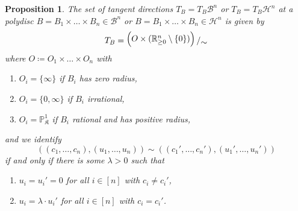 \documentclass[10pt]{article}
\newtheorem{proposition}[theorem]{Proposition}
\theoremstyle{definition}
\newcommand{\PP}{\mathbb{P}}
\newcommand{\bigslant}[2]{{\raisebox{.2em}{$#1$}\left/\raisebox{-.2em}{$#2$}\right.}}
\begin{document}
\begin{proposition}
  \label{prop:tangentSpacePolydisk}
  The set of tangent directions $T_B=T_B\mathcal B^n$ or $T_B=T_B\mathcal H^n$ at a polydisc $B=B_1\times\dots\times B_n\in\mathcal B^n$ or $B=B_1\times\dots\times B_n\in\mathcal H^n$ is given by
  \begin{equation*}
    T_B = \bigslant{
            \Bigl(
              O\times (\mathbb{R}_{\geq0}^n\setminus\{0\})
            \Bigr)}{\sim}
  \end{equation*}
  where $O\coloneqq O_1\times\dots\times O_n$ with
  \begin{enumerate}
    \item[(i)] $O_i=\{\infty\}$ if $B_i$ has zero radius,
    \item[(ii)] $O_i=\{0,\infty\}$ if $B_i$ irrational,
    \item[(iii)] $O_i=\PP_{\mathfrak K}^1$ if $B_i$ rational and has positive radius,
  \end{enumerate}
  and we identify
  \begin{equation*}
    ((c_1,\dots,c_n),(u_1,\dots,u_n)) \sim ((c_1',\dots,c_n'),(u_1',\dots,u_n'))
  \end{equation*}
  if and only if there is some $\lambda>0$ such that
  \begin{enumerate}
  \item[(a)] $u_i = u_i' = 0$ for all $i \in [n]$ with $c_i \neq c_i'$,
  \item[(b)] $u_i = \lambda\cdot u_i'$ for all $i \in [n]$ with $c_i = c_i'$.
  \end{enumerate}
\end{proposition}
\end{document}
